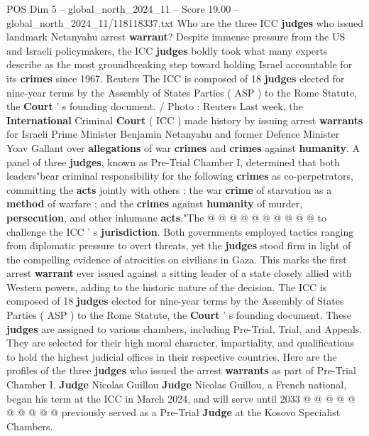 \begin{textsample}{POS Dim 5 – global\_north\_2024\_11 – Score 19.00 – global\_north\_2024\_11/118118337.txt}  \label{ex:f5_pos_035}
Who are the three ICC \textbf{judges} who issued landmark Netanyahu arrest \textbf{warrant}?
Despite immense pressure from the US and Israeli policymakers, the ICC \textbf{judges} boldly took what many experts describe as the most groundbreaking step toward holding Israel accountable for its \textbf{crimes} since 1967.
Reuters The ICC is composed of 18 \textbf{judges} elected for nine-year terms by the Assembly of States Parties ( ASP ) to the Rome Statute, the \textbf{Court} ' s founding document. / Photo : Reuters Last week, the \textbf{International} Criminal \textbf{Court} ( ICC ) made history by issuing arrest \textbf{warrants} for Israeli Prime Minister Benjamin Netanyahu and former Defence Minister Yoav Gallant over \textbf{allegations} of war \textbf{crimes} and \textbf{crimes} against \textbf{humanity}.
A panel of three \textbf{judges}, known as Pre-Trial Chamber I, determined that both leaders"bear criminal responsibility for the following \textbf{crimes} as co-perpetrators, committing the \textbf{acts} jointly with others : the war \textbf{crime} of starvation as a \textbf{method} of warfare ; and the \textbf{crimes} against \textbf{humanity} of murder, \textbf{persecution}, and other inhumane \textbf{acts}."The @ @ @ @ @ @ @ @ @ @ to challenge the ICC ' s \textbf{jurisdiction}.
Both governments employed tactics ranging from diplomatic pressure to overt threats, yet the \textbf{judges} stood firm in light of the compelling evidence of atrocities on civilians in Gaza.
This marks the first arrest \textbf{warrant} ever issued against a sitting leader of a state closely allied with Western powers, adding to the historic nature of the decision.
The ICC is composed of 18 \textbf{judges} elected for nine-year terms by the Assembly of States Parties ( ASP ) to the Rome Statute, the \textbf{Court} ' s founding document.
These \textbf{judges} are assigned to various chambers, including Pre-Trial, Trial, and Appeals.
They are selected for their high moral character, impartiality, and qualifications to hold the highest judicial offices in their respective countries.
Here are the profiles of the three \textbf{judges} who issued the arrest \textbf{warrants} as part of Pre-Trial Chamber I. \textbf{Judge} Nicolas Guillou \textbf{Judge} Nicolas Guillou, a French national, began his term at the ICC in March 2024, and will serve until 2033 @ @ @ @ @ @ @ @ @ @ previously served as a Pre-Trial \textbf{Judge} at the Kosovo Specialist Chambers.

\end{textsample}
